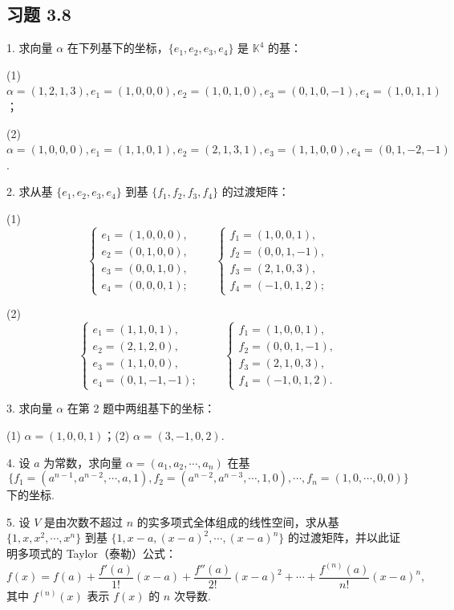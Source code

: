 \documentclass[UTF8, 12pt, fontset=fandol, oneside]{ctexart}
\begin{document}
\subsection*{习题 3.8}

1. 求向量 $\alpha$ 在下列基下的坐标，$\{e_1,e_2,e_3,e_4\}$ 是 $\mathbb{K}^4$ 的基：

(1) $\alpha=(1,2,1,3),e_1=(1,0,0,0),e_2=(1,0,1,0),e_3=(0,1,0,-1),e_4=(1,0,1,1)$；

(2) $\alpha=(1,0,0,0),e_1=(1,1,0,1),e_2=(2,1,3,1),e_3=(1,1,0,0),e_4=(0,1,-2,-1)$.

2. 求从基 $\{e_1,e_2,e_3,e_4\}$ 到基 $\{f_1,f_2,f_3,f_4\}$ 的过渡矩阵：

(1)
\[
\left\{\begin{array}{l}
e_1=(1,0,0,0),\\
e_2=(0,1,0,0),\\
e_3=(0,0,1,0),\\
e_4=(0,0,0,1);
\end{array}\right.
\qquad
\left\{\begin{array}{l}
f_1=(1,0,0,1),\\
f_2=(0,0,1,-1),\\
f_3=(2,1,0,3),\\
f_4=(-1,0,1,2);
\end{array}\right.
\]

(2)
\[
\left\{\begin{array}{l}
e_1=(1,1,0,1),\\
e_2=(2,1,2,0),\\
e_3=(1,1,0,0),\\
e_4=(0,1,-1,-1);
\end{array}\right.
\qquad
\left\{\begin{array}{l}
f_1=(1,0,0,1),\\
f_2=(0,0,1,-1),\\
f_3=(2,1,0,3),\\
f_4=(-1,0,1,2).
\end{array}\right.
\]

3. 求向量 $\alpha$ 在第 2 题中两组基下的坐标：

(1) $\alpha=(1,0,0,1)$；\qquad (2) $\alpha=(3,-1,0,2)$.

4. 设 $a$ 为常数，求向量 $\alpha=(a_1,a_2,\cdots,a_n)$ 在基
\[
\{f_1=(a^{n-1},a^{n-2},\cdots,a,1),f_2=(a^{n-2},a^{n-3},\cdots,1,0),\cdots,f_n=(1,0,\cdots,0,0)\}
\]
下的坐标.

5. 设 $V$ 是由次数不超过 $n$ 的实多项式全体组成的线性空间，求从基 $\{1,x,x^2,\cdots,x^n\}$ 到基 $\{1,x-a,(x-a)^2,\cdots,(x-a)^n\}$ 的过渡矩阵，并以此证明多项式的 Taylor（泰勒）公式：
\[
f(x)=f(a)+\frac{f'(a)}{1!}(x-a)+\frac{f''(a)}{2!}(x-a)^2+\cdots+\frac{f^{(n)}(a)}{n!}(x-a)^n,
\]
其中 $f^{(n)}(x)$ 表示 $f(x)$ 的 $n$ 次导数.
\end{document}
